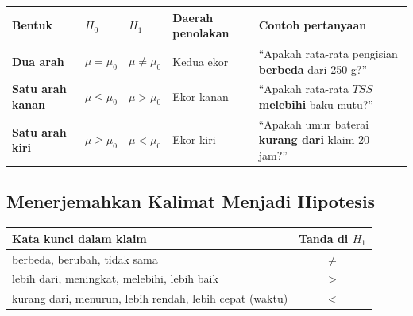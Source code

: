 \documentclass[
  indonesian,
  letterpaper,
]{book}
\newcounter{none} %
\begin{document}
{\def\LTcaptype{none} %
\begin{longtable}[]{@{}
  >{\raggedright\arraybackslash}p{}
  >{\raggedright\arraybackslash}p{}
  >{\raggedright\arraybackslash}p{}
  >{\raggedright\arraybackslash}p{}
  >{\raggedright\arraybackslash}p{}@{}}
\toprule\noalign{}
\begin{minipage}[b]{\linewidth}\raggedright
Bentuk
\end{minipage} & \begin{minipage}[b]{\linewidth}\raggedright
\(H_0\)
\end{minipage} & \begin{minipage}[b]{\linewidth}\raggedright
\(H_1\)
\end{minipage} & \begin{minipage}[b]{\linewidth}\raggedright
Daerah penolakan
\end{minipage} & \begin{minipage}[b]{\linewidth}\raggedright
Contoh pertanyaan
\end{minipage} \\
\midrule\noalign{}
\endhead
\bottomrule\noalign{}
\endlastfoot
\textbf{Dua arah} & \(\mu = \mu_0\) & \(\mu \ne \mu_0\) & Kedua ekor &
``Apakah rata-rata pengisian \textbf{berbeda} dari 250 g?'' \\
\textbf{Satu arah kanan} & \(\mu \le \mu_0\) & \(\mu > \mu_0\) & Ekor
kanan & ``Apakah rata-rata \(TSS\) \textbf{melebihi} baku mutu?'' \\
\textbf{Satu arah kiri} & \(\mu \ge \mu_0\) & \(\mu < \mu_0\) & Ekor
kiri & ``Apakah umur baterai \textbf{kurang dari} klaim 20 jam?'' \\
\end{longtable}
}

\subsection{Menerjemahkan Kalimat Menjadi
Hipotesis}\label{menerjemahkan-kalimat-menjadi-hipotesis}

{\def\LTcaptype{none} %
\begin{longtable}[]{@{}lc@{}}
\toprule\noalign{}
Kata kunci dalam klaim & Tanda di \(H_1\) \\
\midrule\noalign{}
\endhead
\bottomrule\noalign{}
\endlastfoot
berbeda, berubah, tidak sama & \(\ne\) \\
lebih dari, meningkat, melebihi, lebih baik & \(>\) \\
kurang dari, menurun, lebih rendah, lebih cepat (waktu) & \(<\) \\
\end{longtable}
}
\end{document}
